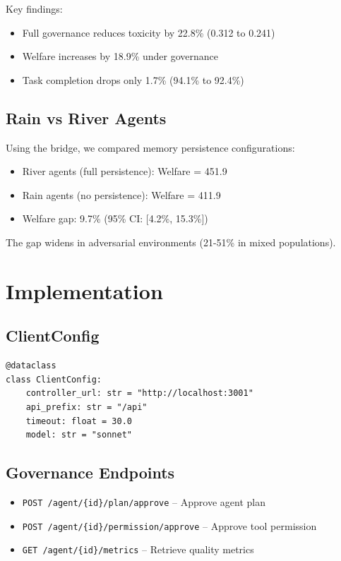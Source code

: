 \documentclass{article}
\begin{document}
Key findings:
\begin{itemize}
\item Full governance reduces toxicity by 22.8\% (0.312 to 0.241)
\item Welfare increases by 18.9\% under governance
\item Task completion drops only 1.7\% (94.1\% to 92.4\%)
\end{itemize}

\subsection{Rain vs River Agents}

Using the bridge, we compared memory persistence configurations:

\begin{itemize}
\item River agents (full persistence): Welfare = 451.9
\item Rain agents (no persistence): Welfare = 411.9
\item Welfare gap: 9.7\% (95\% CI: [4.2\%, 15.3\%])
\end{itemize}

The gap widens in adversarial environments (21-51\% in mixed populations).

\section{Implementation}

\subsection{ClientConfig}

\begin{verbatim}
@dataclass
class ClientConfig:
    controller_url: str = "http://localhost:3001"
    api_prefix: str = "/api"
    timeout: float = 30.0
    model: str = "sonnet"
\end{verbatim}

\subsection{Governance Endpoints}

\begin{itemize}
\item \texttt{POST /agent/\{id\}/plan/approve} -- Approve agent plan
\item \texttt{POST /agent/\{id\}/permission/approve} -- Approve tool permission
\item \texttt{GET /agent/\{id\}/metrics} -- Retrieve quality metrics
\end{itemize}
\end{document}
